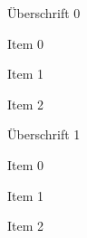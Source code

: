 



{
    \begin{itemgroup}{Überschrift 0}
	\item Item 0
	\item Item 1
	\item Item 2
	\end{itemgroup}
    
	\begin{itemgroup}{Überschrift 1}
	\item Item 0
	\item Item 1
	\item Item 2
	\end{itemgroup}
}



